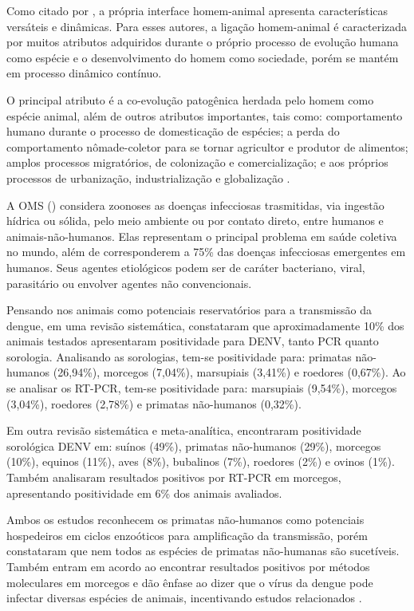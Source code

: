 \indent Como citado por , a própria interface homem-animal apresenta características versáteis e dinâmicas. Para esses autores, a ligação homem-animal é caracterizada por muitos atributos adquiridos durante o próprio processo de evolução humana como espécie e o desenvolvimento do homem como sociedade, porém se mantém em processo dinâmico contínuo.

\indent O principal atributo é a co-evolução patogênica herdada pelo homem como espécie animal, além de outros atributos importantes, tais como: comportamento humano durante o processo de domesticação de espécies; a perda do comportamento nômade-coletor para se tornar agricultor e produtor de alimentos; amplos processos migratórios, de colonização e comercialização;  e aos próprios processos de urbanização, industrialização e globalização \cite{HumanAnimalInterface}.

\indent A \acrshort{OMS} (\citeyear{WHO2020Zoonoses}) considera zoonoses as doenças infecciosas trasmitidas, via ingestão hídrica ou sólida, pelo meio ambiente ou por contato direto, entre humanos e animais-não-humanos. Elas representam o principal problema em saúde coletiva no mundo, além de corresponderem a 75\% das doenças infecciosas emergentes em humanos. Seus agentes etiológicos podem ser de caráter bacteriano, viral, parasitário ou envolver agentes não convencionais.

\indent Pensando nos animais como potenciais reservatórios para a transmissão da dengue,  em uma revisão sistemática, constataram que aproximadamente 10\% dos animais testados apresentaram positividade para \acrshort{DENV}, tanto PCR quanto sorologia. Analisando as sorologias, tem-se positividade para: primatas não-humanos (26,94\%), morcegos (7,04\%), marsupiais (3,41\%) e roedores (0,67\%). Ao se analisar os RT-PCR, tem-se positividade para:  marsupiais (9,54\%), morcegos (3,04\%), roedores (2,78\%) e primatas não-humanos (0,32\%).

\indent Em outra revisão sistemática e meta-analítica,  encontraram positividade sorológica \acrshort{DENV} em: suínos (49\%), primatas não-humanos (29\%), morcegos (10\%), equinos (11\%), aves (8\%), bubalinos (7\%), roedores (2\%) e ovinos (1\%). Também analisaram resultados positivos por RT-PCR em morcegos, apresentando positividade em 6\% dos animais avaliados.

\indent Ambos os estudos reconhecem os primatas não-humanos como potenciais hospedeiros em ciclos enzoóticos para amplificação da transmissão, porém constataram que nem todos as espécies de primatas não-humanas são sucetíveis. Também entram em acordo ao encontrar resultados positivos por métodos moleculares em morcegos e dão ênfase ao dizer que o vírus da dengue pode infectar diversas espécies de animais, incentivando estudos relacionados \cite{Aldana2024DengueAnimals, Dengue_Animals_Gwee_2021}.

